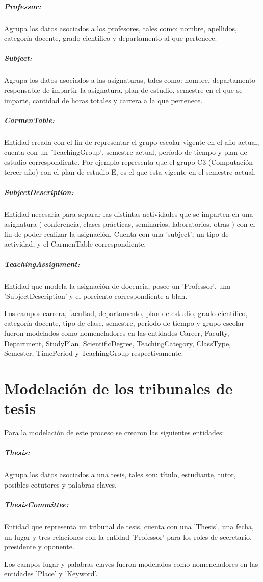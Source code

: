 \subparagraph{Professor:}
Agrupa los datos asociados a los profesores, 
tales como: nombre, apellidos, categoría docente, grado 
científico y departamento al que pertenece.

\subparagraph{Subject:}
Agrupa los datos asociados a las asignaturas,
tales como: nombre, departamento responsable de impartir
la asignatura, plan de estudio, semestre en el que se 
imparte, cantidad de horas totales y carrera a la que 
pertenece.

\subparagraph{CarmenTable:}
Entidad creada con el fin de representar
el grupo escolar vigente en el año actual, cuenta con un
'TeachingGroup', semestre actual, período de tiempo y 
plan de estudio correspondiente. Por ejemplo representa 
que el grupo C3 (Computación tercer año) con el plan de 
estudio E, es el que esta vigente en el semestre actual.

\subparagraph{SubjectDescription:}
Entidad necesaria para separar las distintas actividades 
que se imparten en una asignatura ( conferencia, clases 
prácticas, seminarios, laboratorios, otras ) con el fin 
de poder realizar la asignación. Cuenta con una 'subject',
un tipo de actividad, y el CarmenTable correspondiente.


\subparagraph{TeachingAssignment:}
Entidad que modela la asignación de docencia, posee un
'Professor', una 'SubjectDescription' y
el porciento correspondiente a blah.

Los campos carrera, facultad, departamento, plan de 
estudio, grado científico, categoría docente, tipo de 
clase, semestre, período de tiempo y grupo escolar fueron
modelados como nomencladores en las entidades Career,
Faculty, Department, StudyPlan, ScientificDegree, 
TeachingCategory, ClassType, Semester, TimePeriod y 
TeachingGroup respectivamente.


\section{Modelación de los tribunales de tesis}
Para la modelación de este proceso se crearon las 
siguientes entidades:

\subparagraph{Thesis:}
Agrupa los datos asociados a una tesis, tales son:
título, estudiante, tutor, posibles cotutores y palabras
claves.

\subparagraph{ThesisCommittee:}
Entidad que representa un tribunal de tesis, cuenta con 
una 'Thesis', una fecha, un lugar y tres relaciones con 
la entidad 'Professor' para los roles de
secretario, presidente y oponente.

Los campos lugar y palabras claves fueron modelados como
nomencladores en las entidades 'Place' y 'Keyword'.